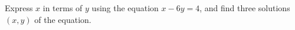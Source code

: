 Express $x$ in terms of $y$ using the equation $x-6y=4$, and find three solutions $(x,y)$ of the equation.

